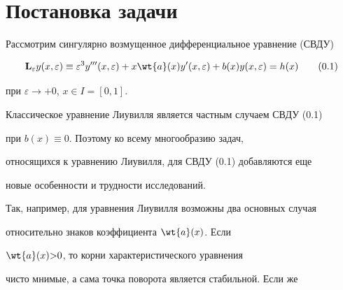 \date{}




\pagestyle{plain} %







\maketitle


\label{begin}











\section*{Постановка задачи}





Рассмотрим сингулярно возмущенное дифференциальное уравнение (СВДУ)


\begin{equation}


\bold{L}_{\e} y (x, \e ) \equiv \e^3 y''' (x, \e) +x \wt{a}


(x) y' (x, \e) + b(x) y(x, \e) = h (x)\tag{0.1}


\end{equation}


при $\varepsilon\rightarrow +0$, $ x \in I=[0,1]$.





Классическое уравнение Лиувилля является частным случаем СВДУ (0.1)


при $b (x) \equiv 0$. Поэтому ко всему многообразию задач,


относящихся к уравнению Лиувилля, для СВДУ (0.1) добавляются еще


новые особенности и трудности исследований.


Так, например, для уравнения Лиувилля возможны два основных случая


относительно знаков коэффициента $\wt{a} (x)$. Если


$\wt{a} (x){>} 0$, то корни характеристического уравнения


чисто мнимые, а сама точка поворота является стабильной. Если же


